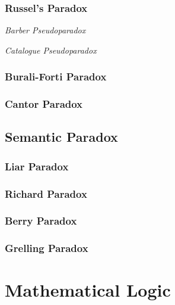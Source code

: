 \subsubsection{Russel's Paradox}\label{sec:russels_paradox}

\emph{Barber Pseudoparadox}

\emph{Catalogue Pseudoparadox}



\subsubsection{Burali-Forti Paradox}\label{sec:baruliforti_paradox}

\subsubsection{Cantor Paradox}\label{sec:cantor_paradox}



\subsection{Semantic Paradox}\label{sec:semantic_paradox}

\subsubsection{Liar Paradox}\label{sec:liar_paradox}

\subsubsection{Richard Paradox}\label{sec:richard_paradox}

\subsubsection{Berry Paradox}\label{sec:berry_paradox}

\subsubsection{Grelling Paradox}\label{sec:grelling_paradox}



\section{Mathematical Logic}\label{sec:mathematical_logic}
\cite{curry77}

